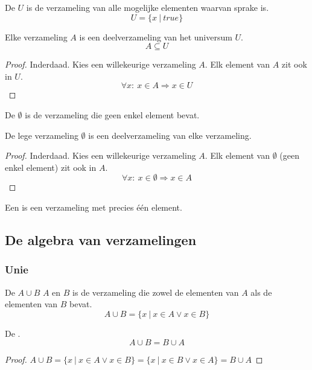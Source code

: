 \documentclass[main.tex]{subfiles}
\begin{document}
\begin{de}
  De  $U$ is de verzameling van alle mogelijke elementen waarvan sprake is.
  \[ U = \{ x\ |\ true\} \]
\end{de}

\begin{st}
  Elke verzameling $A$ is een deelverzameling van het universum $U$.
  \[ A \subseteq U \]
  \begin{proof}
    Inderdaad. Kies een willekeurige verzameling $A$. 
    Elk element van $A$ zit ook in $U$.
    \[
    \forall x:\ x \in A \Rightarrow x \in U
    \]
  \end{proof}
\end{st}

\begin{de}
  De  $\emptyset$ is de verzameling die geen enkel element bevat.
\end{de}

\begin{st}
  De lege verzameling $\emptyset$ is een deelverzameling van elke verzameling.
  \begin{proof}
    Inderdaad. Kies een willekeurige verzameling $A$.
    Elk element van $\emptyset$ (geen enkel element) zit ook in $A$.
    \[
    \forall x:\ x \in \emptyset \Rightarrow x \in A
    \]
  \end{proof}
\end{st}

\begin{de}
  Een  is een verzameling met precies \'e\'en element.
\end{de}

\subsection{De algebra van verzamelingen}
\label{sec:de-algebra-van-verzamelingen}
\subsubsection{Unie}
\label{sec:unie}

\begin{de}
  De  $A \cup B$  $A$ en $B$ is de verzameling die zowel de elementen van $A$ als de elementen van $B$ bevat.
  \[ A \cup B = \{ x\ |\ x \in A \vee x \in B\} \]
\end{de}

\begin{ei}
  De .
  \[ A \cup B = B \cup A \]
  \begin{proof}
    $A \cup B = \{ x\ |\ x \in A \vee x \in B\} = \{ x\ |\ x \in B \vee x \in A\} = B \cup A$
  \end{proof}
\end{ei}
\end{document}
